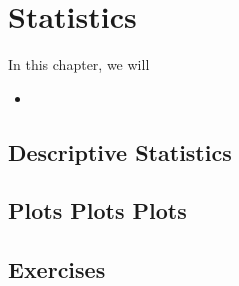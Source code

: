 
\chapter{Statistics}

\begin{summary}
In this chapter, we will 
\begin{itemize}
    \item 
\end{itemize}
\end{summary}

\newpage 

\section{Descriptive Statistics}

\section{Plots Plots Plots}


\section{Exercises} 